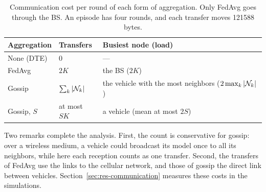 \begin{table}[tbp]
  \centering
  \small
  \caption[Communication cost of each form of aggregation]{Communication cost per round of each form of
    aggregation. Only \acs{FedAvg} goes through the \acs{BS}. An episode has four rounds, and each transfer
    moves \num{121588} bytes.}
  \label{tab:pa-cost}
  \begin{tabularx}{\linewidth}{@{}l l >{\raggedright\arraybackslash}X@{}}
    \toprule
    Aggregation & Transfers & Busiest node (load) \\
    \midrule
    None (\acs{DTE}) & 0 & --- \\
    \acs{FedAvg} & $2K$ & the \acs{BS} ($2K$) \\
    Gossip & $\textstyle\sum_k |\mathcal{N}_k|$ & the vehicle with the most neighbors
      ($\textstyle 2 \max_k |\mathcal{N}_k|$) \\
    Gossip, $S$ & at most $SK$ & a vehicle (mean at most $2S$) \\
    \bottomrule
  \end{tabularx}
\end{table}

Two remarks complete the analysis. First, the count is conservative for gossip: over a wireless medium, a vehicle could broadcast its
model once to all its neighbors, while here each reception counts as one transfer. Second, the transfers of
\ac{FedAvg} use the links to the cellular network, and those of gossip the direct link between vehicles.
Section~\ref{sec:res-communication} measures these costs in the simulations.
